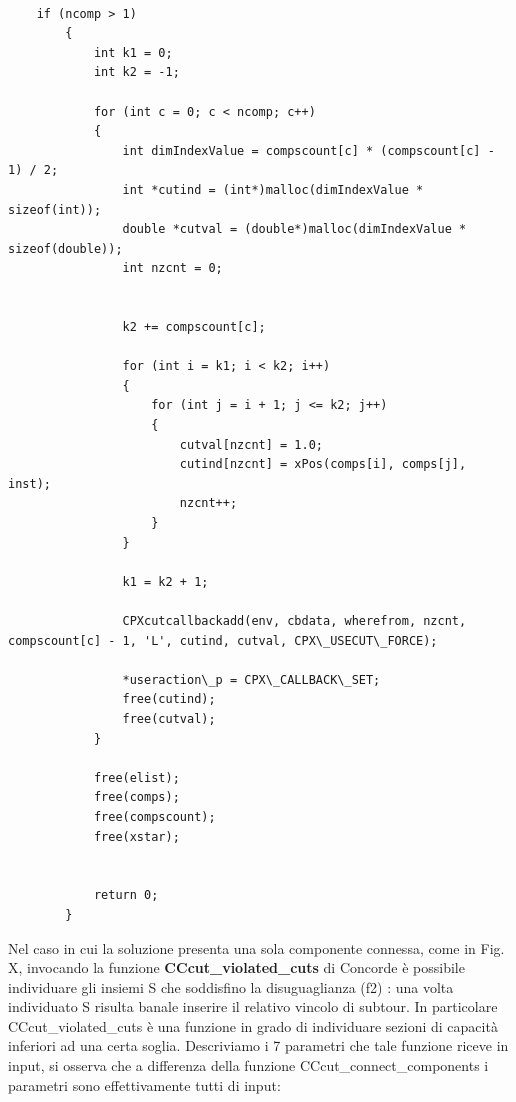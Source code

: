 \documentclass[11pt]{article}
\begin{document}
\begin{lstlisting}

	if (ncomp > 1)
		{
			int k1 = 0;
			int k2 = -1;

			for (int c = 0; c < ncomp; c++)
			{
				int dimIndexValue = compscount[c] * (compscount[c] - 1) / 2; 
				int *cutind = (int*)malloc(dimIndexValue * sizeof(int));
				double *cutval = (double*)malloc(dimIndexValue * sizeof(double));
				int nzcnt = 0;

				
				k2 += compscount[c];

				for (int i = k1; i < k2; i++)
				{
					for (int j = i + 1; j <= k2; j++)
					{
						cutval[nzcnt] = 1.0;
						cutind[nzcnt] = xPos(comps[i], comps[j], inst);
						nzcnt++;
					}
				}

				k1 = k2 + 1;	
				
				CPXcutcallbackadd(env, cbdata, wherefrom, nzcnt, compscount[c] - 1, 'L', cutind, cutval, CPX\_USECUT\_FORCE);

				*useraction\_p = CPX\_CALLBACK\_SET; 
				free(cutind);
				free(cutval);
			}

			free(elist);
			free(comps);
			free(compscount);
			free(xstar);


			return 0;
		}

\end{lstlisting}


Nel caso in cui la soluzione presenta una sola componente connessa, come in Fig. X, invocando la funzione \textbf{CCcut\_violated\_cuts} di Concorde è possibile individuare gli insiemi S che soddisfino la disuguaglianza (f2) : una volta individuato S risulta banale inserire il relativo vincolo di subtour. In particolare CCcut\_violated\_cuts è una funzione in grado di individuare sezioni di capacità inferiori ad una certa soglia. Descriviamo i 7 parametri che tale funzione riceve in input, si osserva che a differenza della funzione CCcut\_connect\_components i parametri sono effettivamente tutti di input:
\end{document}
